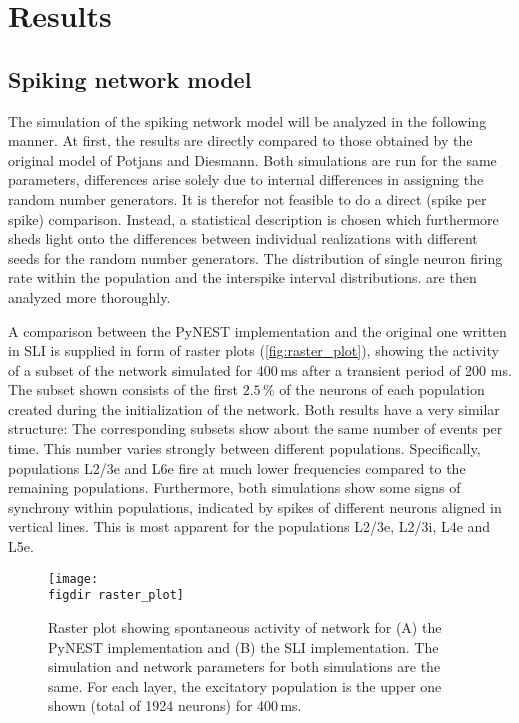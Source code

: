 \chapter{Results}
\label{sec:results}

\section{Spiking network model}
The simulation of the spiking network model will be analyzed in the following manner. 
At first, the results are directly compared to those obtained by the original 
model of Potjans and Diesmann. Both simulations are run for the same parameters, 
differences arise solely due to internal differences in assigning the random 
number generators. It is therefor not feasible to do a direct (spike per spike) 
comparison. Instead, a statistical description is chosen which furthermore sheds light
onto the differences between individual realizations with different seeds for the 
random number generators.
The distribution of single neuron firing rate within the population
and the interspike interval distributions.
are then analyzed more thoroughly. 

A comparison between the PyNEST implementation and the original one written in SLI
is supplied in form of raster plots (\autoref{fig:raster_plot}), 
showing the activity of a subset of the network simulated for 400\,ms 
after a transient period of 200 ms. The subset shown consists of the first 
$2.5\,\%$ of the neurons of each population created during the initialization of the network. 
Both results have a very similar structure: 
The corresponding subsets show about the same number of events per time. This 
number varies strongly between different populations. Specifically, populations L2/3e and L6e 
fire at much lower frequencies compared to the remaining populations. 
Furthermore, both simulations show some signs of synchrony within populations, indicated by spikes 
of different neurons aligned in vertical lines. This is most apparent for the populations L2/3e, L2/3i, L4e and 
L5e.
\begin{figure}[tb]
    \centering
    \texttt{[image: \\figdir raster\_plot]}
    \caption[Raster plot: PyNEST and SLI]{
        Raster plot showing spontaneous activity of network for 
        (A) the PyNEST implementation and (B) the SLI implementation.
        The simulation and network parameters for both simulations are 
        the same. 
        For each layer, the excitatory population is the upper one shown 
        (total of 1924 neurons) for 400\,ms. 
    }
    \label{fig:raster_plot}
\end{figure}

